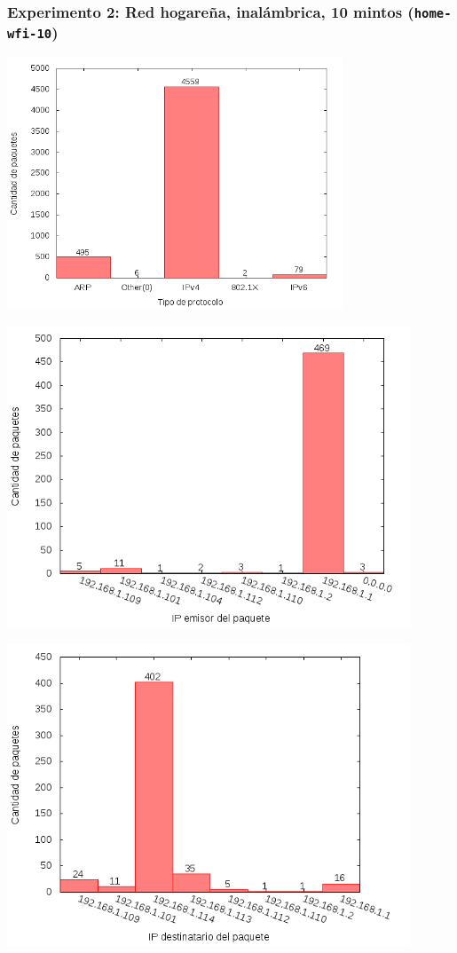 \subsubsection{Experimento 2: Red hogareña, inalámbrica, 10 mintos (\texttt{home-wfi-10})}

\includegraphics[width=10cm]{../mediciones/home-wfi-10/home-wfi-10Protocolos.png}

\includegraphics[width=12cm]{../mediciones/home-wfi-10/home-wfi-10IpsSrcArp.png}

\includegraphics[width=12cm]{../mediciones/home-wfi-10/home-wfi-10IpsDstArp.png}

